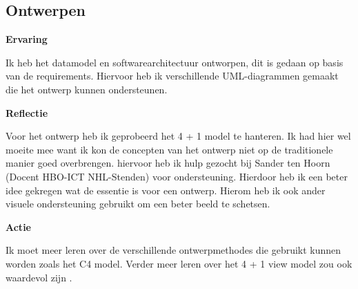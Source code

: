 \subsection{Ontwerpen}
\textbf{Ervaring}

\whitespace
Ik heb het datamodel en softwarearchitectuur ontworpen, dit is gedaan op basis van de requirements.
Hiervoor heb ik verschillende UML-diagrammen gemaakt die het ontwerp kunnen ondersteunen.

\whitespace
\textbf{Reflectie}

\whitespace
Voor het ontwerp heb ik geprobeerd het 4 + 1 model te hanteren. 
Ik had hier wel moeite mee want ik kon de concepten van het ontwerp niet op de traditionele manier goed overbrengen.
hiervoor heb ik hulp gezocht bij Sander ten Hoorn (Docent HBO-ICT NHL-Stenden) voor ondersteuning.
Hierdoor heb ik een beter idee gekregen wat de essentie is voor een ontwerp.  
Hierom heb ik ook ander visuele ondersteuning gebruikt om een beter beeld te schetsen.

\whitespace
\textbf{Actie}

\whitespace
Ik moet meer leren over de verschillende ontwerpmethodes die gebruikt kunnen worden zoals het C4 model.
Verder meer leren over het 4 + 1 view model zou ook waardevol zijn .
